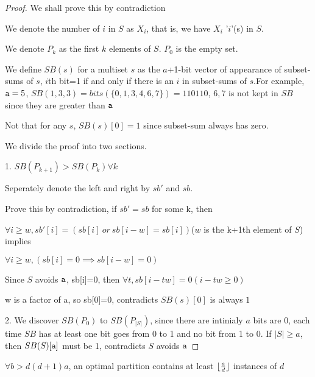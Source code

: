 \begin{proof}

We shall prove this by contradiction

We denote the number of $i$ in $S$ as $X_i$, that is, we have $X_i$ '$i$'(s) in $S$.

We denote $P_k$ as the first $k$ elements of $S$. $P_0$ is the empty set.

We define $SB(s)$ for a multiset $s$ as the $a$+1-bit vector of appearance of subset-sums of $s$, $i$th bit=1 if and only if there is an $i$ in subset-sums of $s$.For example, $\mathtt{a}=5$, $SB({1,3,3})=bits(\{ 0,1,3,4,6,7\})=110110$, ${6,7}$ is not kept in $SB$ since they are greater than $\mathtt{a}$

Not that for any $s$, $SB(s)[0]=1$ since subset-sum always has zero.

We divide the proof into two sections.

1. $SB(P_{k+1})>SB(P_k) \forall k$ 

Seperately denote the left and right by $sb'$ and $sb$.

Prove this by contradiction, if $sb'=sb$ for some k, then 

$\forall i\geq w,sb'[i] = (sb[i]\ or\ sb[i-w]=sb[i])$($w$ is the k+1th element of $S$) implies

$\forall i\geq w, (sb[i]=0 \implies sb[i-w]=0)$

Since $S$ avoids $\mathtt{a}$, sb[i]=0, then $\forall t, sb[i-tw]=0(i-tw\geq 0)$

w is a factor of a, so sb[0]=0, contradicts $SB(s)[0]$ is always $1$

2. We discover $SB(P_0)$ to $SB(P_{|S|})$, since there are intinialy $a$ bits are 0, each time
$SB$ has at least one bit goes from 0 to 1 and no bit from 1 to 0. If $|S|\geq a$, then $SB(S)[\mathtt{a}]$
must be 1, contradicts $S$ avoids $\mathtt{a}$


\end{proof}

\begin{theorem}
$\forall b>d(d+1)a$, an optimal partition contains at least $\lfloor\frac{a}{d}\rfloor$ instances of $d$
\end{theorem}


